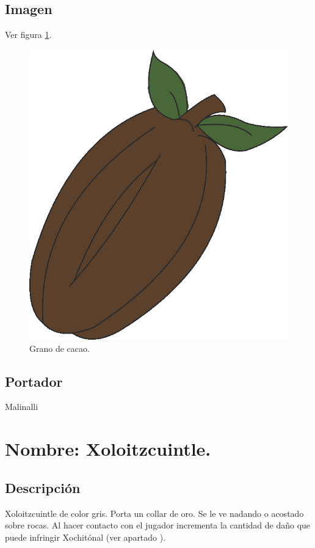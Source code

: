	\subsection{Imagen}
	Ver figura \ref{fig:granoCacao}.
		\begin{figure}
			\centering
			\includegraphics[height=0.2 \textheight]{Imagenes/granoCacao}
			\caption{Grano de cacao.}
			\label{fig:granoCacao}
		\end{figure}
	\subsection{Portador}
	Malinalli 

	\section{Nombre: Xoloitzcuintle.}\label{item:Xolo}
	\subsection{Descripción}
Xoloitzcuintle de color gris. Porta un collar de oro. Se le ve nadando o acostado sobre rocas. Al hacer contacto con el jugador incrementa la cantidad de daño que puede infringir Xochitónal (ver apartado \label{Nivel:Niv02}).	
